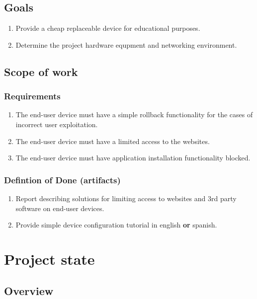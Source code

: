 \documentclass[a4paper]{report}
\begin{document}
\chapter{Goals}

\begin{enumerate}
\item Provide a cheap replaceable device for educational purposes.
\item Determine the project hardware equpment and networking environment.
\end{enumerate}


\chapter{Scope of work}

\section{Requirements}

\begin{enumerate}
\item The end-user device must have a simple rollback functionality for
the cases of incorrect user exploitation.
\item The end-user device must have a limited access to the websites.
\item The end-user device must have application installation
functionality blocked.
\end{enumerate}

\section{Defintion of Done (artifacts)}

\begin{enumerate}
\item Report describing solutions for limiting access to websites and
3rd party software on end-user devices.
\item Provide simple device configuration tutorial in english
\textbf{or} spanish.
\end{enumerate}


\part{Project state}

\chapter{Overview}
\end{document}
